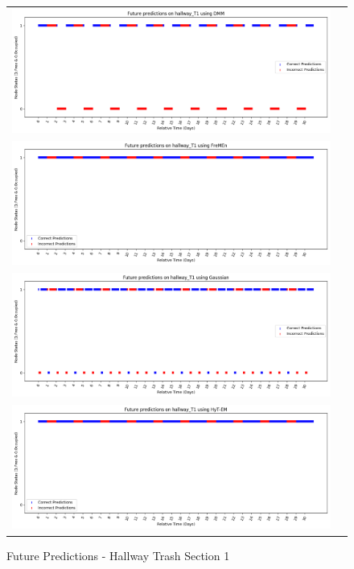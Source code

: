 \begin{figure}[!Hp]
  \begin{tabular}{cc}
    {\includegraphics[width = 6in]{images/results/Future_hallway_T1_DMM.png}} \\
    {\includegraphics[width = 6in]{images/results/Future_hallway_T1_FreMEn.png}} \\
    {\includegraphics[width = 6in]{images/results/Future_hallway_T1_Gaussian.png}} \\
    {\includegraphics[width = 6in]{images/results/Future_hallway_T1_HyT-EM.png}} \\
  \end{tabular}
  \caption{Future Predictions - Hallway Trash Section 1}
\end{figure}

